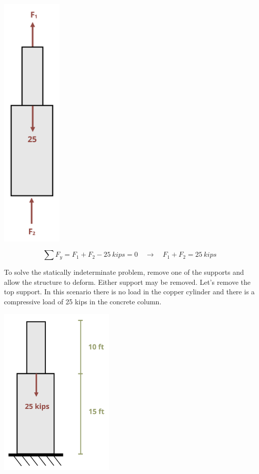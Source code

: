 \documentclass[
  letterpaper,
  DIV=11,
  numbers=noendperiod]{scrreprt}
\theoremstyle{definition}
\theoremstyle{remark}
\begin{document}
\begin{tcolorbox}
\begin{tcolorbox}
\begin{center}
\includegraphics[width=1.15625in,height=\textheight]{images/PNGs/Example 5.5 part 2.png}
\end{center}

\[
\sum F_y=F_1+F_2-25{~kips}=0 \quad\rightarrow\quad F_1+F_2=25{~kips}
\]

To solve the statically indeterminate problem, remove one of the
supports and allow the structure to deform. Either support may be
removed. Let's remove the top support. In this scenario there is no load
in the copper cylinder and there is a compressive load of 25 kips in the
concrete column.

\begin{center}
\includegraphics[width=2.1875in,height=\textheight]{images/PNGs/Example 5.5 part 3.png}
\end{center}


\end{tcolorbox}
\end{tcolorbox}
\end{document}
